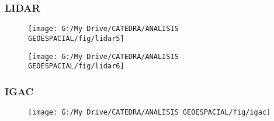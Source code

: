 \documentclass[14pt]{beamer}
\begin{document}
\begin{frame}
\frametitle{LIDAR}
 \begin{figure}
    \centering
    \texttt{[image: G:/My Drive/CATEDRA/ANALISIS GEOESPACIAL/fig/lidar5]}
  \end{figure}
\end{frame}
\begin{frame} 
 \begin{figure}
    \centering
    \texttt{[image: G:/My Drive/CATEDRA/ANALISIS GEOESPACIAL/fig/lidar6]}
  \end{figure}
\end{frame}
\begin{frame}
\frametitle{IGAC}
 \begin{figure}
    \centering
    \texttt{[image: G:/My Drive/CATEDRA/ANALISIS GEOESPACIAL/fig/igac]}
  \end{figure}
\end{frame}
\end{document}
